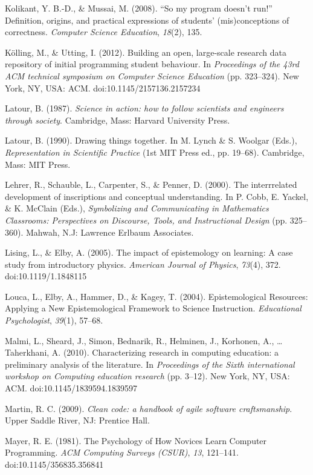 Kolikant, Y. B.-D., \& Mussai, M. (2008). ``So my program doesn't run!''
Definition, origins, and practical expressions of students'
(mis)conceptions of correctness. \emph{Computer Science Education},
\emph{18}(2), 135.

Kölling, M., \& Utting, I. (2012). Building an open, large-scale
research data repository of initial programming student behaviour. In
\emph{Proceedings of the 43rd ACM technical symposium on Computer
Science Education} (pp. 323--324). New York, NY, USA: ACM.
doi:10.1145/2157136.2157234

Latour, B. (1987). \emph{Science in action: how to follow scientists and
engineers through society}. Cambridge, Mass: Harvard University Press.

Latour, B. (1990). Drawing things together. In M. Lynch \& S. Woolgar
(Eds.), \emph{Representation in Scientific Practice} (1st MIT Press ed.,
pp. 19--68). Cambridge, Mass: MIT Press.

Lehrer, R., Schauble, L., Carpenter, S., \& Penner, D. (2000). The
interrrelated development of inscriptions and conceptual understanding.
In P. Cobb, E. Yackel, \& K. McClain (Eds.), \emph{Symbolizing and
Communicating in Mathematics Classrooms: Perspectives on Discourse,
Tools, and Instructional Design} (pp. 325--360). Mahwah, N.J: Lawrence
Erlbaum Associates.

Lising, L., \& Elby, A. (2005). The impact of epistemology on learning:
A case study from introductory physics. \emph{American Journal of
Physics}, \emph{73}(4), 372. doi:10.1119/1.1848115

Louca, L., Elby, A., Hammer, D., \& Kagey, T. (2004). Epistemological
Resources: Applying a New Epistemological Framework to Science
Instruction. \emph{Educational Psychologist}, \emph{39}(1), 57--68.

Malmi, L., Sheard, J., Simon, Bednarik, R., Helminen, J., Korhonen, A.,
\ldots{} Taherkhani, A. (2010). Characterizing research in computing
education: a preliminary analysis of the literature. In
\emph{Proceedings of the Sixth international workshop on Computing
education research} (pp. 3--12). New York, NY, USA: ACM.
doi:10.1145/1839594.1839597

Martin, R. C. (2009). \emph{Clean code: a handbook of agile software
craftsmanship}. Upper Saddle River, NJ: Prentice Hall.

Mayer, R. E. (1981). The Psychology of How Novices Learn Computer
Programming. \emph{ACM Computing Surveys (CSUR)}, \emph{13}, 121--141.
doi:10.1145/356835.356841

